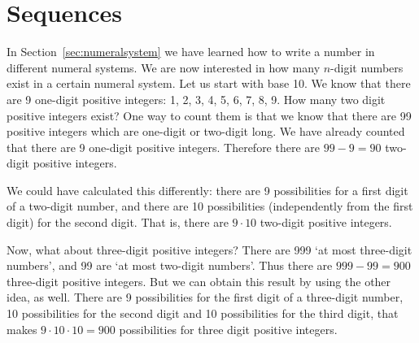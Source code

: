 



\section{Sequences}\label{sec:sequences}

In Section~\ref{sec:numeralsystem} we have learned how to write a number in different numeral systems. 
We are now interested in how many $n$-digit numbers exist in a certain numeral system. 
Let us start with base 10. 
We know that there are 9 one-digit positive integers: 1, 2, 3, 4, 5, 6, 7, 8, 9. 
How many two digit positive integers exist? 
One way to count them is that we know that there are 99 positive integers which are one-digit or two-digit long. 
We have already counted that there are 9 one-digit positive integers. 
Therefore there are $99-9=90$ two-digit positive integers. 

We could have calculated this differently: 
there are 9 possibilities for a first digit of a two-digit number, 
and there are 10 possibilities (independently from the first digit) for the second digit. 
That is, there are $9 \cdot 10$ two-digit positive integers. 

Now, what about three-digit positive integers? 
There are 999 `at most three-digit numbers', 
and 99 are `at most two-digit numbers'. 
Thus there are $999-99=900$ three-digit positive integers. 
But we can obtain this result by using the other idea, as well. 
There are 9 possibilities for the first digit of a three-digit number, 
10 possibilities for the second digit and 10 possibilities for the third digit, 
that makes $9 \cdot 10 \cdot 10 = 900$ possibilities for three digit positive integers. 

